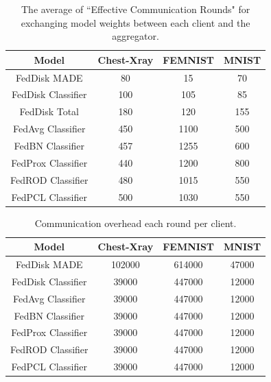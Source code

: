 \documentclass[journal]{IEEEtai}
\begin{document}
\begin{table}[!h]
        \begin{center}
                \begin{tabular}{c|c|c|c}
                        Model & Chest-Xray & FEMNIST & MNIST \\
                        \hline
                        FedDisk MADE & 80 & 15 & 70 \\
                        FedDisk Classifier & 100 & 105 & 85 \\
                        FedDisk Total & 180 & 120 & 155 \\
                        FedAvg Classifier & 450 & 1100 & 500 \\
                        FedBN Classifier & 457 & 1255 & 600 \\
                        FedProx Classifier & 440 & 1200 & 800 \\
                        FedROD Classifier & 480 & 1015 & 550 \\
                        FedPCL Classifier & 500 & 1030 & 550 \\
                \end{tabular}
        \end{center}
        \caption{The average of ``Effective Communication Rounds" for exchanging model weights between each client and the aggregator.}
        \label{tab:ecr}
\end{table}


\begin{table}[!h]
       \begin{center}
                \begin{tabular}{c|c|c|c}
                        Model & Chest-Xray & FEMNIST & MNIST \\
                        \hline
                        FedDisk MADE & 102000 & 614000 & 47000 \\
                        FedDisk Classifier & 39000 & 447000 & 12000 \\
                        FedAvg Classifier & 39000 & 447000 & 12000 \\
                        FedBN Classifier & 39000 & 447000 & 12000 \\
                        FedProx Classifier & 39000 & 447000 & 12000 \\
                        FedROD Classifier & 39000 & 447000 & 12000 \\
                        FedPCL Classifier & 39000 & 447000 & 12000 \\
                \end{tabular}
        \end{center}
        \caption{Communication overhead each round per client.}
        \label{tab:modelSize}
\end{table}
\end{document}
